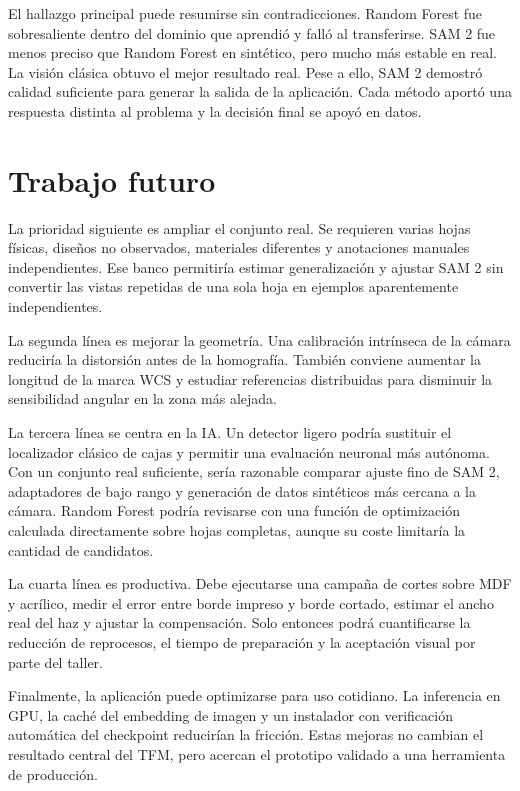 El hallazgo principal puede resumirse sin contradicciones. Random Forest fue sobresaliente dentro del dominio que aprendió y falló al transferirse. SAM 2 fue menos preciso que Random Forest en sintético, pero mucho más estable en real. La visión clásica obtuvo el mejor resultado real. Pese a ello, SAM 2 demostró calidad suficiente para generar la salida de la aplicación. Cada método aportó una respuesta distinta al problema y la decisión final se apoyó en datos.

\section{Trabajo futuro}

La prioridad siguiente es ampliar el conjunto real. Se requieren varias hojas físicas, diseños no observados, materiales diferentes y anotaciones manuales independientes. Ese banco permitiría estimar generalización y ajustar SAM 2 sin convertir las vistas repetidas de una sola hoja en ejemplos aparentemente independientes.

La segunda línea es mejorar la geometría. Una calibración intrínseca de la cámara reduciría la distorsión antes de la homografía. También conviene aumentar la longitud de la marca WCS y estudiar referencias distribuidas para disminuir la sensibilidad angular en la zona más alejada.

La tercera línea se centra en la IA. Un detector ligero podría sustituir el localizador clásico de cajas y permitir una evaluación neuronal más autónoma. Con un conjunto real suficiente, sería razonable comparar ajuste fino de SAM 2, adaptadores de bajo rango y generación de datos sintéticos más cercana a la cámara. Random Forest podría revisarse con una función de optimización calculada directamente sobre hojas completas, aunque su coste limitaría la cantidad de candidatos.

La cuarta línea es productiva. Debe ejecutarse una campaña de cortes sobre MDF y acrílico, medir el error entre borde impreso y borde cortado, estimar el ancho real del haz y ajustar la compensación. Solo entonces podrá cuantificarse la reducción de reprocesos, el tiempo de preparación y la aceptación visual por parte del taller.

Finalmente, la aplicación puede optimizarse para uso cotidiano. La inferencia en GPU, la caché del embedding de imagen y un instalador con verificación automática del checkpoint reducirían la fricción. Estas mejoras no cambian el resultado central del TFM, pero acercan el prototipo validado a una herramienta de producción.
